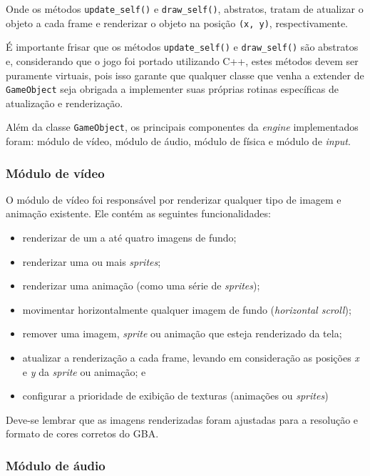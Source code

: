     Onde os métodos \texttt{update\_self()} e \texttt{draw\_self()}, abstratos, tratam de atualizar o objeto a cada frame e renderizar o objeto na posição \texttt{(x, y)}, respectivamente.

    É importante frisar que os métodos \texttt{update\_self()} e \texttt{draw\_self()} são abstratos e, considerando que o jogo foi portado utilizando C++, estes métodos devem ser puramente virtuais, pois isso garante que qualquer classe que venha a extender de \texttt{GameObject} seja obrigada a implementer suas próprias rotinas específicas de atualização e renderização.

    Além da classe \texttt{GameObject}, os principais componentes da \textit{engine} implementados foram: módulo de vídeo, módulo de áudio, módulo de física e módulo de \textit{input}.

    \subsubsection{Módulo de vídeo}

      O módulo de vídeo foi responsável por renderizar qualquer tipo de imagem e animação existente. Ele contém as seguintes funcionalidades:

      \begin{itemize}
        \item renderizar de um a até quatro imagens de fundo;
        \item renderizar uma ou mais \textit{sprites};
        \item renderizar uma animação (como uma série de \textit{sprites});
        \item movimentar horizontalmente qualquer imagem de fundo (\textit{horizontal scroll});
        \item remover uma imagem, \textit{sprite} ou animação que esteja renderizado da tela;
        \item atualizar a renderização a cada frame, levando em consideração as posições \textit{x} e \textit{y} da \textit{sprite} ou animação; e
        \item configurar a prioridade de exibição de texturas (animações ou \textit{sprites})
      \end{itemize}

      Deve-se lembrar que as imagens renderizadas foram ajustadas para a resolução e formato de cores corretos do GBA.

    \subsubsection{Módulo de áudio}

